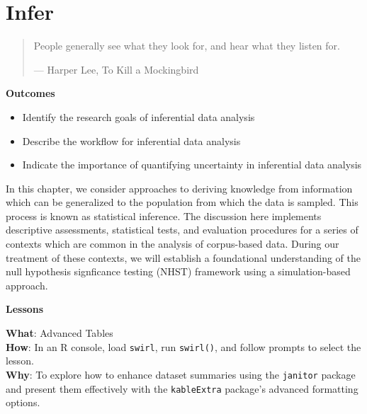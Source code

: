 \documentclass[
  letterpaper,
]{latex/krantz}
\providecommand{\tightlist}{%
  \setlength{\itemsep}{0pt}\setlength{\parskip}{0pt}}\usepackage{longtable,booktabs,array}
\theoremstyle{definition}
\theoremstyle{remark}
\begin{document}
\chapter{Infer}\label{sec-infer-chapter}

\begin{quote}
People generally see what they look for, and hear what they listen for.

--- Harper Lee, To Kill a Mockingbird
\end{quote}

\begin{tcolorbox}[enhanced jigsaw, breakable, leftrule=.75mm, arc=.35mm, colframe=quarto-callout-color-frame, colback=white, left=2mm, bottomrule=.15mm, rightrule=.15mm, toprule=.15mm, opacityback=0]

\textbf{ Outcomes}

\begin{itemize}
\tightlist
\item
  Identify the research goals of inferential data analysis
\item
  Describe the workflow for inferential data analysis
\item
  Indicate the importance of quantifying uncertainty in inferential data
  analysis
\end{itemize}

\end{tcolorbox}

In this chapter, we consider approaches to deriving knowledge from
information which can be generalized to the population from which the
data is sampled. This process is known as statistical inference. The
discussion here implements descriptive assessments, statistical tests,
and evaluation procedures for a series of contexts which are common in
the analysis of corpus-based data. During our treatment of these
contexts, we will establish a foundational understanding of the null
hypothesis signficance testing (NHST) framework using a simulation-based
approach.

\begin{tcolorbox}[enhanced jigsaw, breakable, leftrule=.75mm, arc=.35mm, colframe=quarto-callout-color-frame, colback=white, left=2mm, bottomrule=.15mm, rightrule=.15mm, toprule=.15mm, opacityback=0]

\textbf{ Lessons}

\textbf{What}: Advanced Tables\\
\textbf{How}: In an R console, load \texttt{swirl}, run
\texttt{swirl()}, and follow prompts to select the lesson.\\
\textbf{Why}: To explore how to enhance dataset summaries using the
\texttt{janitor} package and present them effectively with the
\texttt{kableExtra} package's advanced formatting options.

\end{tcolorbox}
\end{document}
